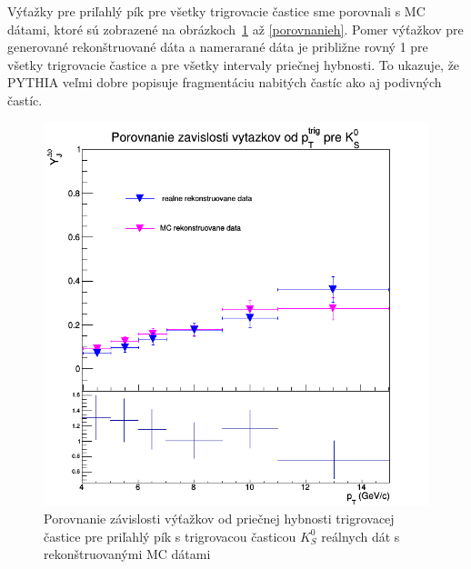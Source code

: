 \documentclass[thesismargins, thesislinespacing]{rnthesis}
\begin{document}
Výťažky pre priľahlý pík pre všetky trigrovacie častice sme porovnali s MC dátami, ktoré sú zobrazené na obrázkoch~\ref{porovnanie} až \ref{porovnanieh}. Pomer výťažkov pre generované \-re\-konšt\-ru\-o\-va\-né dáta a namerarané dáta je približne rovný 1 pre všetky trigrovacie častice a pre všetky intervaly priečnej hybnosti. To ukazuje, že PYTHIA veľmi dobre popisuje fragmentáciu nabitých častíc ako aj podivných častíc. 

\begin{figure}[hbtp!]
	\centering
	\includegraphics[scale=0.4]{./Obrazky_praca/Vytazok_porovnanieMC.png}
	\caption{Porovnanie závislosti výťažkov od priečnej hybnosti trigrovacej častice pre priľahlý pík s trigrovacou časticou $K^0_S$ reálnych dát s rekonštruovanými MC dátami}
	\label{porovnanie}
\end{figure}
\end{document}
